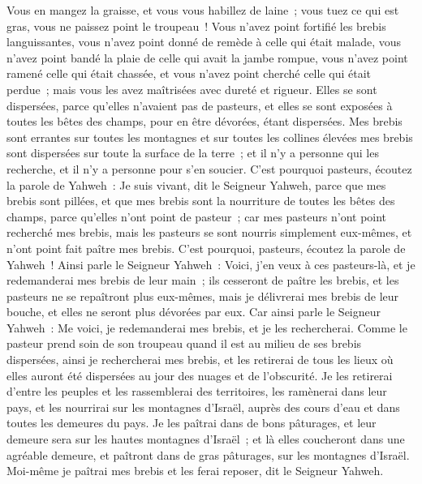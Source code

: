 \begin{multicols}{2}
Vous en mangez la graisse, et vous vous habillez de laine~; vous tuez ce qui est gras, vous ne paissez point le troupeau~!
Vous n'avez point fortifié les brebis languissantes, vous n'avez point donné de remède à celle qui était malade, vous n'avez point bandé la plaie de celle qui avait la jambe rompue, vous n'avez point ramené celle qui était chassée, et vous n'avez point cherché celle qui était perdue~; mais vous les avez maîtrisées avec dureté et rigueur.
Elles se sont dispersées, parce qu'elles n'avaient pas de pasteurs, et elles se sont exposées à toutes les bêtes des champs, pour en être dévorées, étant dispersées.
Mes brebis sont errantes sur toutes les montagnes et sur toutes les collines élevées mes brebis sont dispersées sur toute la surface de la terre~; et il n'y a personne qui les recherche, et il n'y a personne pour s'en soucier.
C'est pourquoi pasteurs, écoutez la parole de Yahweh~:
Je suis vivant, dit le Seigneur Yahweh, parce que mes brebis sont pillées, et que mes brebis sont la nourriture de toutes les bêtes des champs, parce qu'elles n'ont point de pasteur~; car mes pasteurs n'ont point recherché mes brebis, mais les pasteurs se sont nourris simplement eux-mêmes, et n'ont point fait paître mes brebis.
C'est pourquoi, pasteurs, écoutez la parole de Yahweh~!
Ainsi parle le Seigneur Yahweh~: Voici, j'en veux à ces pasteurs-là, et je redemanderai mes brebis de leur main~; ils cesseront de paître les brebis, et les pasteurs ne se repaîtront plus eux-mêmes, mais je délivrerai mes brebis de leur bouche, et elles ne seront plus dévorées par eux.
Car ainsi parle le Seigneur Yahweh~: Me voici, je redemanderai mes brebis, et je les rechercherai.
Comme le pasteur prend soin de son troupeau quand il est au milieu de ses brebis dispersées, ainsi je rechercherai mes brebis, et les retirerai de tous les lieux où elles auront été dispersées au jour des nuages et de l'obscurité.
Je les retirerai d'entre les peuples et les rassemblerai des territoires, les ramènerai dans leur pays, et les nourrirai sur les montagnes d'Israël, auprès des cours d'eau et dans toutes les demeures du pays.
Je les paîtrai dans de bons pâturages, et leur demeure sera sur les hautes montagnes d'Israël~; et là elles coucheront dans une agréable demeure, et paîtront dans de gras pâturages, sur les montagnes d'Israël.
Moi-même je paîtrai mes brebis et les ferai reposer, dit le Seigneur Yahweh.

\end{multicols}
